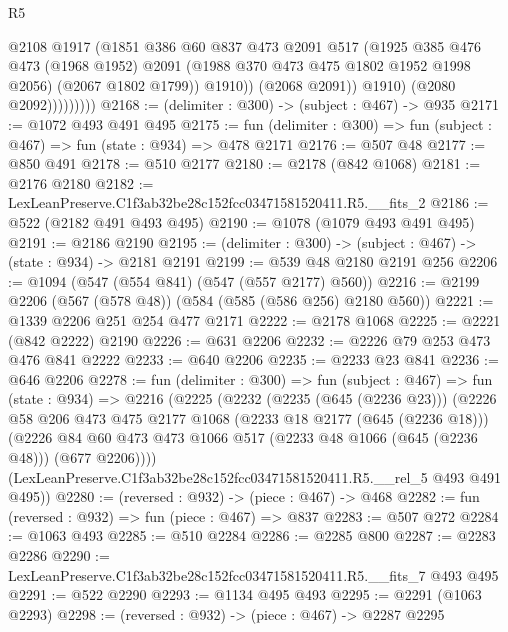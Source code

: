 \begin{lexlean}{R5}
\begin{coremodule}
                          @2108
                          @1917
                          (@1851
                            @386
                            @60
                            @837
                            @473
                            @2091
                            @517
                            (@1925
                              @385
                              @476
                              @473
                              (@1968 @1952)
                              @2091
                              (@1988 @370 @473 @475 @1802 @1952 @1998 @2056)
                              (@2067 @1802 @1799))
                            @1910))
                        (@2068 @2091))
                      @1910)
                    (@2080 @2092)))))))))
@2168 := (delimiter : @300) -> (subject : @467) -> @935
@2171 := @1072 @493 @491 @495
@2175 := fun (delimiter : @300) => fun (subject : @467) => fun (state : @934) => @478 @2171
@2176 := @507 @48
@2177 := @850 @491
@2178 := @510 @2177
@2180 := @2178 (@842 @1068)
@2181 := @2176 @2180
@2182 := LexLeanPreserve.C1f3ab32be28c152fcc03471581520411.R5.__fits_2
@2186 := @522 (@2182 @491 @493 @495)
@2190 := @1078 (@1079 @493 @491 @495)
@2191 := @2186 @2190
@2195 := (delimiter : @300) -> (subject : @467) -> (state : @934) -> @2181 @2191
@2199 := @539 @48 @2180 @2191 @256
@2206 := @1094 (@547 (@554 @841) (@547 (@557 @2177) @560))
@2216 := @2199 @2206 (@567 (@578 @48)) (@584 (@585 (@586 @256) @2180 @560))
@2221 := @1339 @2206 @251 @254 @477 @2171
@2222 := @2178 @1068
@2225 := @2221 (@842 @2222) @2190
@2226 := @631 @2206
@2232 := @2226 @79 @253 @473 @476 @841 @2222
@2233 := @640 @2206
@2235 := @2233 @23 @841
@2236 := @646 @2206
@2278 := fun (delimiter : @300) =>
  fun (subject : @467) =>
  fun (state : @934) =>
  @2216
    (@2225
      (@2232
        (@2235 (@645 (@2236 @23)))
        (@2226
          @58
          @206
          @473
          @475
          @2177
          @1068
          (@2233 @18 @2177 (@645 (@2236 @18)))
          (@2226 @84 @60 @473 @473 @1066 @517 (@2233 @48 @1066 (@645 (@2236 @48))) (@677 @2206))))
      (LexLeanPreserve.C1f3ab32be28c152fcc03471581520411.R5.__rel_5 @493 @491 @495))
@2280 := (reversed : @932) -> (piece : @467) -> @468
@2282 := fun (reversed : @932) => fun (piece : @467) => @837
@2283 := @507 @272
@2284 := @1063 @493
@2285 := @510 @2284
@2286 := @2285 @800
@2287 := @2283 @2286
@2290 := LexLeanPreserve.C1f3ab32be28c152fcc03471581520411.R5.__fits_7 @493 @495
@2291 := @522 @2290
@2293 := @1134 @495 @493
@2295 := @2291 (@1063 @2293)
@2298 := (reversed : @932) -> (piece : @467) -> @2287 @2295

\end{coremodule}
\end{lexlean}
